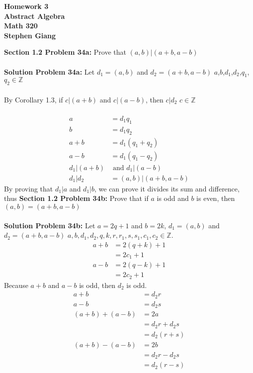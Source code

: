 \documentclass[12pt]{article}
\begin{document}
	
	\begin{center}
		\textbf{Homework 3} \\
		\textbf{Abstract Algebra} \\
		\textbf{Math 320} \\
		\textbf{Stephen Giang} \\
	\end{center}
\vspace{\baselineskip}
\noindent \textbf{Section 1.2 Problem 34a: } Prove that $(a,b)|(a+b,a-b)$ 
\\\\
\noindent \textbf{Solution Problem 34a: } Let $d_1 = (a,b)$ and $d_2=(a+b,a-b)$ \qquad $a$,$b$,$d_1$,$d_2$,$q_1$,$q_2 \in \mathbb{Z}$ 
\\\\
By Corollary 1.3, if $c|(a+b)$ and $c|(a-b)$, then $c|d_2$ \quad $c \in \mathbb{Z}$
\\\\
	\begin{align}
		a &= d_1q_1 \\
		b &= d_1q_2 \\
		a+b &= d_1(q_1 + q_2) \\
		a-b &= d_1(q_1 - q_2) \\
		d_1 | (a+b) &\text{ and } d_1 | (a-b) \\
		d_1 | d_2 &= (a,b) | (a+b,a-b)
	\end{align}
By proving that $d_1 | a$ and $d_1|b$, we can prove it divides its sum and difference,\\ thus 
\newpage
\noindent \textbf{Section 1.2 Problem 34b: } Prove that if $a$ is odd and $b$ is even, then $(a, b) = (a + b, a - b)$
\\\\
\noindent \textbf{Solution Problem 34b: } Let $a=2q+1$ and $b = 2k$, $d_1 = (a,b)$ and $d_2=(a+b,a-b)$ \qquad $a,b,d_1,d_2,q,k,r,r_1,s,s_1,c_1,c_2 \in \mathbb{Z} $.
	\begin{align}
		a + b &= 2(q+k) + 1 \\
		&= 2c_1 + 1 \\
		a - b &= 2(q-k) + 1 \\
		&= 2c_2 + 1
	\end{align}
Because $a+b$ and $a-b$ is odd, then $d_2$ is odd. 
	\begin{align}
		a+b &= d_2 r \\
		a-b &= d_2 s \\
		(a + b) + (a - b) &= 2a \\
		&= d_2 r + d_2 s \\
		&= d_2(r+s) \\
		(a + b) - (a - b) &= 2b \\
		&= d_2 r - d_2 s \\
		&= d_2(r-s)
	\end{align}
\end{document}
